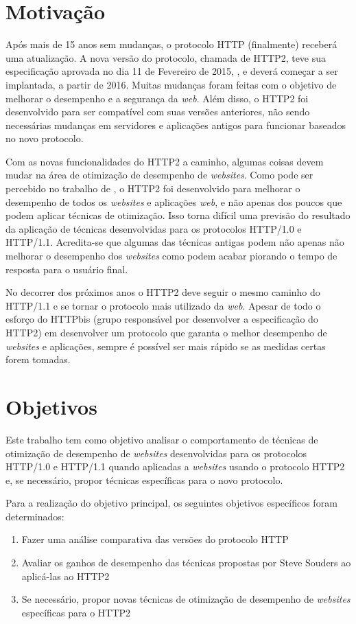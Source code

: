 \section{Motivação}
\label{sec:motivacao}

Após mais de 15 anos sem mudanças, o protocolo HTTP (finalmente) receberá uma atualização. A nova versão do protocolo, chamada de HTTP2, teve sua especificação aprovada no dia 11 de Fevereiro de 2015, \cite{HTTP2Spec}, e deverá começar a ser implantada, a partir de 2016. Muitas mudanças foram feitas com o objetivo de melhorar o desempenho e a segurança da \textit{web}. Além disso, o HTTP2 foi desenvolvido para ser compatível com suas versões anteriores, não sendo necessárias mudanças em servidores e aplicações antigos para funcionar baseados no novo protocolo.

Com as novas funcionalidades do HTTP2 a caminho, algumas coisas devem mudar na área de otimização de desempenho de \textit{websites}. Como pode ser percebido no trabalho de , o HTTP2 foi desenvolvido para melhorar o desempenho de todos os \textit{websites} e aplicações \textit{web}, e não apenas dos poucos que podem aplicar técnicas de otimização. Isso torna difícil uma previsão do resultado da aplicação de técnicas desenvolvidas para os protocolos HTTP/1.0 e HTTP/1.1. Acredita-se que algumas das técnicas antigas podem não apenas não melhorar o desempenho dos \textit{websites} como podem acabar piorando o tempo de resposta para o usuário final.

No decorrer dos próximos anos o HTTP2 deve seguir o mesmo caminho do HTTP/1.1 e se tornar o protocolo mais utilizado da \textit{web}. Apesar de todo o esforço do HTTPbis (grupo responsável por desenvolver a especificação do HTTP2) em desenvolver um protocolo que garanta o melhor desempenho de \textit{websites} e aplicações, sempre é possível ser mais rápido se as medidas certas forem tomadas.

\section{Objetivos}
\label{sec:objetivos}

Este trabalho tem como objetivo analisar o comportamento de técnicas de otimização de desempenho de \textit{websites} desenvolvidas para os protocolos HTTP/1.0 e HTTP/1.1 quando aplicadas a \textit{websites} usando o protocolo HTTP2 e, se necessário, propor técnicas específicas para o novo protocolo.

Para a realização do objetivo principal, os seguintes objetivos específicos foram determinados:

\begin{enumerate}
	\item Fazer uma análise comparativa das versões do protocolo HTTP
	\item Avaliar os ganhos de desempenho das técnicas propostas por Steve Souders ao aplicá-las ao HTTP2
	\item Se necessário, propor novas técnicas de otimização de desempenho de \textit{websites} específicas para o HTTP2
\end{enumerate}
